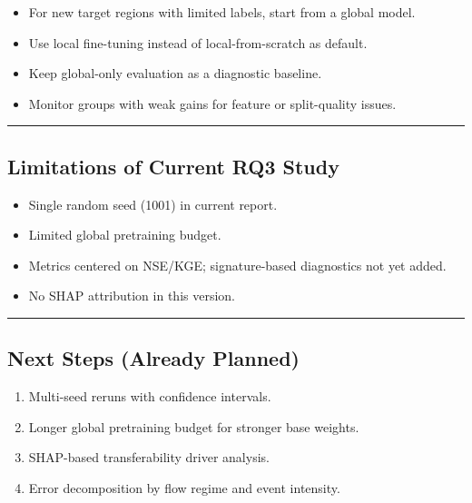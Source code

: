 \documentclass[
  letterpaper,
  DIV=11,
  numbers=noendperiod]{scrartcl}
\providecommand{\tightlist}{%
  \setlength{\itemsep}{0pt}\setlength{\parskip}{0pt}}
\begin{document}
\begin{itemize}
\tightlist
\item
  For new target regions with limited labels, start from a global model.
\item
  Use local fine-tuning instead of local-from-scratch as default.
\item
  Keep global-only evaluation as a diagnostic baseline.
\item
  Monitor groups with weak gains for feature or split-quality issues.
\end{itemize}

\begin{center}\rule{0.5\linewidth}{0.5pt}\end{center}

\subsection{Limitations of Current RQ3
Study}\label{limitations-of-current-rq3-study}

\begin{itemize}
\tightlist
\item
  Single random seed (1001) in current report.
\item
  Limited global pretraining budget.
\item
  Metrics centered on NSE/KGE; signature-based diagnostics not yet
  added.
\item
  No SHAP attribution in this version.
\end{itemize}

\begin{center}\rule{0.5\linewidth}{0.5pt}\end{center}

\subsection{Next Steps (Already
Planned)}\label{next-steps-already-planned}

\begin{enumerate}
\def\labelenumi{\arabic{enumi}.}
\tightlist
\item
  Multi-seed reruns with confidence intervals.
\item
  Longer global pretraining budget for stronger base weights.
\item
  SHAP-based transferability driver analysis.
\item
  Error decomposition by flow regime and event intensity.
\end{enumerate}
\end{document}
